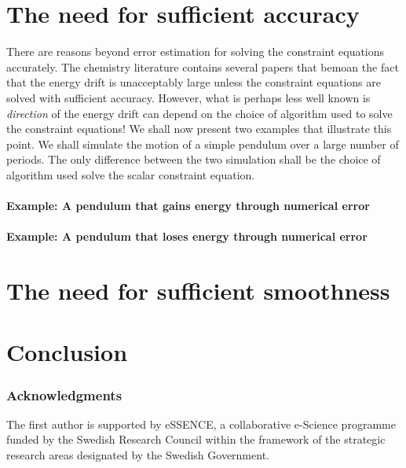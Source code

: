 \documentclass[runningheads]{llncs}
\begin{document}
\section{The need for sufficient accuracy}






There are reasons beyond error estimation for solving the constraint equations accurately. The chemistry literature contains several papers that bemoan the fact that the energy drift is unacceptably large unless the constraint equations are solved with sufficient accuracy. However, what is perhaps less well known is \emph{direction} of the energy drift can depend on the choice of algorithm used to solve the constraint equations! We shall now present two examples that illustrate this point. We shall simulate the motion of a simple pendulum over a large number of periods. The only difference between the two simulation shall be the choice of algorithm used solve the scalar constraint equation.

\paragraph{Example: A pendulum that gains energy through numerical error}

\paragraph{Example: A pendulum that loses energy through numerical error} 

\section{The need for sufficient smoothness}




\section{Conclusion}



\subsubsection{Acknowledgments}

The first author is supported by eSSENCE, a collaborative e-Science programme funded by the Swedish Research Council within the framework of the strategic research areas designated by the Swedish Government.


%
%
%


 
\end{document}
